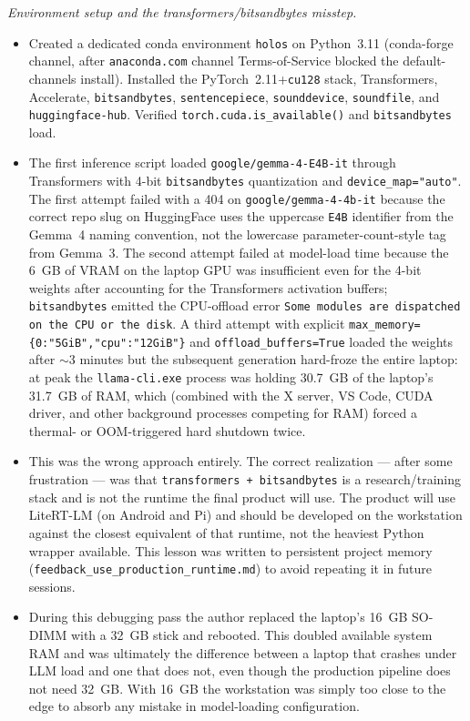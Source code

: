 \documentclass{article}
\theoremstyle{plain}
\theoremstyle{definition}
\theoremstyle{remark}
\begin{document}
\textit{Environment setup and the transformers/bitsandbytes misstep.}
\begin{itemize}
\item Created a dedicated conda environment \texttt{holos} on Python~3.11 (conda-forge channel, after \texttt{anaconda.com} channel Terms-of-Service blocked the default-channels install). Installed the PyTorch~2.11+\texttt{cu128} stack, Transformers, Accelerate, \texttt{bitsandbytes}, \texttt{sentencepiece}, \texttt{sounddevice}, \texttt{soundfile}, and \texttt{huggingface-hub}. Verified \texttt{torch.cuda.is\_available()} and \texttt{bitsandbytes} load.
\item The first inference script loaded \texttt{google/gemma-4-E4B-it} through Transformers with 4-bit \texttt{bitsandbytes} quantization and \texttt{device\_map="auto"}. The first attempt failed with a 404 on \texttt{google/gemma-4-4b-it} because the correct repo slug on HuggingFace uses the uppercase \texttt{E4B} identifier from the Gemma~4 naming convention, not the lowercase parameter-count-style tag from Gemma~3. The second attempt failed at model-load time because the 6~GB of VRAM on the laptop GPU was insufficient even for the 4-bit weights after accounting for the Transformers activation buffers; \texttt{bitsandbytes} emitted the CPU-offload error \texttt{Some modules are dispatched on the CPU or the disk}. A third attempt with explicit \texttt{max\_memory=\{0:"5GiB","cpu":"12GiB"\}} and \texttt{offload\_buffers=True} loaded the weights after $\sim$3 minutes but the subsequent generation hard-froze the entire laptop: at peak the \texttt{llama-cli.exe} process was holding 30.7~GB of the laptop's 31.7~GB of RAM, which (combined with the X server, VS Code, CUDA driver, and other background processes competing for RAM) forced a thermal- or OOM-triggered hard shutdown twice.
\item This was the wrong approach entirely. The correct realization --- after some frustration --- was that \texttt{transformers + bitsandbytes} is a research/training stack and is not the runtime the final product will use. The product will use LiteRT-LM (on Android and Pi) and should be developed on the workstation against the closest equivalent of that runtime, not the heaviest Python wrapper available. This lesson was written to persistent project memory (\texttt{feedback\_use\_production\_runtime.md}) to avoid repeating it in future sessions.
\item During this debugging pass the author replaced the laptop's 16~GB SO-DIMM with a 32~GB stick and rebooted. This doubled available system RAM and was ultimately the difference between a laptop that crashes under LLM load and one that does not, even though the production pipeline does not need 32~GB. With 16~GB the workstation was simply too close to the edge to absorb any mistake in model-loading configuration.
\end{itemize}
\end{document}
